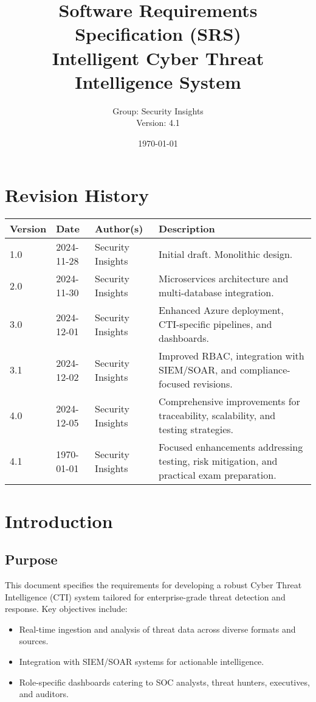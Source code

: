 \documentclass[12pt]{article}
\title{Software Requirements Specification (SRS) \\ \vspace{1em} \Large Intelligent Cyber Threat Intelligence System}
\author{Group: Security Insights \\ Version: 4.1}
\date{\today}
\begin{document}
\maketitle
\thispagestyle{empty}

\newpage
\tableofcontents
\newpage

\section*{Revision History}
\begin{longtable}{|p{2cm}|p{3cm}|p{3cm}|p{5cm}|}
\hline
\textbf{Version} & \textbf{Date} & \textbf{Author(s)} & \textbf{Description} \\
\hline
1.0 & 2024-11-28 & Security Insights & Initial draft. Monolithic design. \\
\hline
2.0 & 2024-11-30 & Security Insights & Microservices architecture and multi-database integration. \\
\hline
3.0 & 2024-12-01 & Security Insights & Enhanced Azure deployment, CTI-specific pipelines, and dashboards. \\
\hline
3.1 & 2024-12-02 & Security Insights & Improved RBAC, integration with SIEM/SOAR, and compliance-focused revisions. \\
\hline
4.0 & 2024-12-05 & Security Insights & Comprehensive improvements for traceability, scalability, and testing strategies. \\
\hline
4.1 & \today & Security Insights & Focused enhancements addressing testing, risk mitigation, and practical exam preparation. \\
\hline
\end{longtable}

\newpage

\section{Introduction}
\subsection{Purpose}
This document specifies the requirements for developing a robust Cyber Threat Intelligence (CTI) system tailored for enterprise-grade threat detection and response. Key objectives include:
\begin{itemize}
    \item Real-time ingestion and analysis of threat data across diverse formats and sources.
    \item Integration with SIEM/SOAR systems for actionable intelligence.
    \item Role-specific dashboards catering to SOC analysts, threat hunters, executives, and auditors.
\end{itemize}
\end{document}
